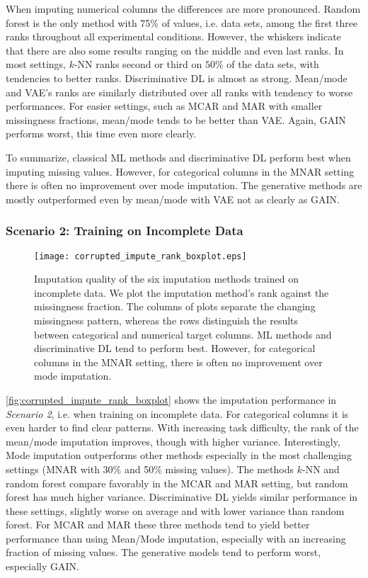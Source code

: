 When imputing numerical columns the differences are more pronounced. Random forest is the only method with 75\% of values, i.e. data sets, among the first three ranks throughout all experimental conditions. However, the whiskers indicate that there are also some results ranging on the middle and even last ranks. In most settings, $k$-NN ranks second or third on $50\%$ of the data sets, with tendencies to better ranks. Discriminative DL is almost as strong. Mean/mode and VAE's ranks are similarly distributed over all ranks with tendency to worse performances. For easier settings, such as MCAR and MAR with smaller missingness fractions, mean/mode tends to be better than VAE. Again, GAIN performs worst, this time even more clearly.

To summarize, classical ML methods and discriminative DL perform best when imputing missing values. However, for categorical columns in the MNAR setting there is often no improvement over mode imputation. The generative methods are mostly outperformed even by mean/mode with VAE not as clearly as GAIN.


\subsubsection{Scenario 2: Training on Incomplete Data}


\begin{figure}\centering
    \texttt{[image: corrupted\_impute\_rank\_boxplot.eps]}

    \caption[Imputation Ranks - Corrupted]{Imputation quality of the six imputation methods trained on incomplete data. We plot the imputation method's rank against the missingness fraction. The columns of plots separate the changing missingness pattern, whereas the rows distinguish the results between categorical and numerical target columns. ML methods and discriminative DL tend to perform best. However, for categorical columns in the MNAR setting, there is often no improvement over mode imputation. 
    }
	\label{fig:corrupted_impute_rank_boxplot}
\end{figure}

\autoref{fig:corrupted_impute_rank_boxplot} shows the imputation performance in \textit{Scenario 2}, i.e. when training on incomplete data. For categorical columns it is even harder to find clear patterns. With increasing task difficulty, the rank of the mean/mode imputation improves, though with higher variance. Interestingly, Mode imputation outperforms other methods especially in the most challenging settings (MNAR with 30\% and 50\% missing values). The methods $k$-NN and random forest compare favorably in the MCAR and MAR setting, but random forest has much higher variance. Discriminative DL yields similar performance in these settings, slightly worse on average and with lower variance than random forest. For MCAR and MAR these three methods tend to yield better performance than using Mean/Mode imputation, especially with an increasing fraction of missing values. The generative models tend to perform worst, especially GAIN.

